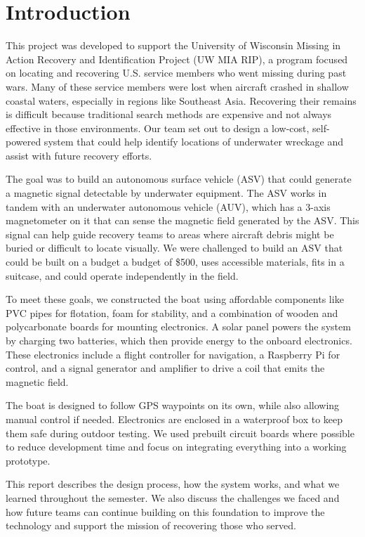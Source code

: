 \section{Introduction}

This project was developed to support the University of Wisconsin Missing in Action Recovery and Identification Project (UW MIA RIP), a program focused on locating and recovering U.S. service members who went missing during past wars. Many of these service members were lost when aircraft crashed in shallow coastal waters, especially in regions like Southeast Asia. Recovering their remains is difficult because traditional search methods are expensive and not always effective in those environments. Our team set out to design a low-cost, self-powered system that could help identify locations of underwater wreckage and assist with future recovery efforts.

The goal was to build an autonomous surface vehicle (ASV) that could generate a magnetic signal detectable by underwater equipment. The ASV works in tandem with an underwater autonomous vehicle (AUV), which has a 3-axis magnetometer on it that can sense the magnetic field generated by the ASV. This signal can help guide recovery teams to areas where aircraft debris might be buried or difficult to locate visually. We were challenged to build an ASV that could be built on a budget a budget of \$500, uses accessible materials, fits in a suitcase, and could operate independently in the field.

To meet these goals, we constructed the boat using affordable components like PVC pipes for flotation, foam for stability, and a combination of wooden and polycarbonate boards for mounting electronics. A solar panel powers the system by charging two batteries, which then provide energy to the onboard electronics. These electronics include a flight controller for navigation, a Raspberry Pi for control, and a signal generator and amplifier to drive a coil that emits the magnetic field.

The boat is designed to follow GPS waypoints on its own, while also allowing manual control if needed. Electronics are enclosed in a waterproof box to keep them safe during outdoor testing. We used prebuilt circuit boards where possible to reduce development time and focus on integrating everything into a working prototype.

This report describes the design process, how the system works, and what we learned throughout the semester. We also discuss the challenges we faced and how future teams can continue building on this foundation to improve the technology and support the mission of recovering those who served.